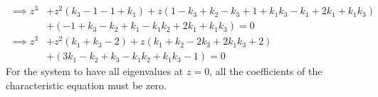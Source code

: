 \begin{align*}
    \implies
    z^3
     & +
    z^2(k_3 - 1 - 1 + k_1)
    +
    z(1 - k_3 + k_2 - k_3 + 1 + k_1 k_3 - k_1 + 2k_1 + k_1 k_3)
    \\ & +
    (- 1 + k_3 - k_2 + k_1 - k_1 k_2 + 2 k_1 + k_1 k_3)
    = 0
    \\
    \implies
    z^3
     & +
    z^2(k_1 + k_3 - 2)
    +
    z(k_1 + k_2 - 2k_3 + 2 k_1 k_3 + 2)
    \\ & +
    (3k_1 - k_2 + k_3 - k_1 k_2 + k_1 k_3 - 1)
    = 0
\end{align*}
For the system to have all eigenvalues at \( z = 0 \), all the coefficients of the characteristic equation must be zero.
